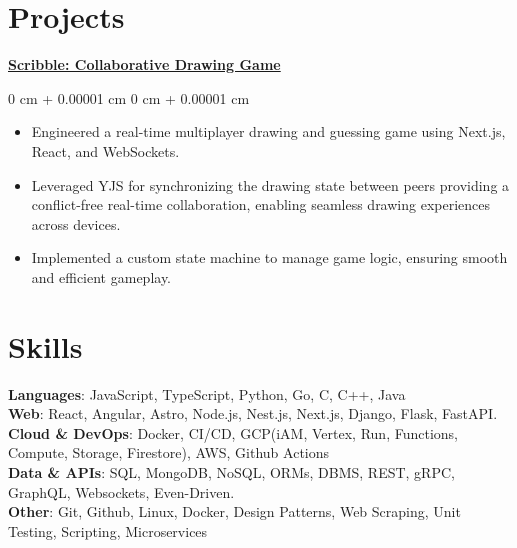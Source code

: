 \documentclass[10pt, letterpaper]{article}
\newenvironment{highlights}{
    \begin{itemize}[
        topsep=0.10 cm,
        parsep=0.10 cm,
        partopsep=0pt,
        itemsep=0pt,
        leftmargin=0 cm + 10pt
    ]
}{
    \end{itemize}
} %
\newenvironment{onecolentry}{
    \begin{adjustwidth}{
        0 cm + 0.00001 cm
    }{
        0 cm + 0.00001 cm
    }
}{
    \end{adjustwidth}
} %
\begin{document}
\section{Projects}
\textbf{\href{https://github.com/elweday1/scribble}{Scribble: Collaborative Drawing Game}}
\vspace{0.10 cm}
\begin{onecolentry}
    \begin{highlights}
        \item Engineered a real-time multiplayer drawing and guessing game using Next.js, React, and WebSockets.
        \item Leveraged YJS for synchronizing the drawing state between peers providing a conflict-free real-time collaboration, enabling seamless drawing experiences across devices.
        \item Implemented a custom state machine to manage game logic, ensuring smooth and efficient gameplay.

    \end{highlights}
\end{onecolentry}

\section{Skills}


\textbf{Languages}{: JavaScript, TypeScript, Python, Go, C, C++, Java} \\ \vspace{0.2 cm}
\textbf{Web}{: React, Angular, Astro, Node.js, Nest.js, Next.js, Django, Flask, FastAPI.} \\ \vspace{0.2 cm}
\textbf{Cloud \& DevOps}{: Docker, CI/CD, GCP(iAM, Vertex, Run, Functions, Compute, Storage, Firestore), AWS, Github Actions} \\ \vspace{0.2 cm}
\textbf{Data \& APIs}{: SQL, MongoDB, NoSQL, ORMs, DBMS, REST, gRPC, GraphQL, Websockets, Even-Driven.} \\ \vspace{0.2 cm}
\textbf{Other}{: Git, Github, Linux, Docker, Design Patterns, Web Scraping, Unit Testing, Scripting, Microservices} \\ \vspace{0.2 cm}
\end{document}
